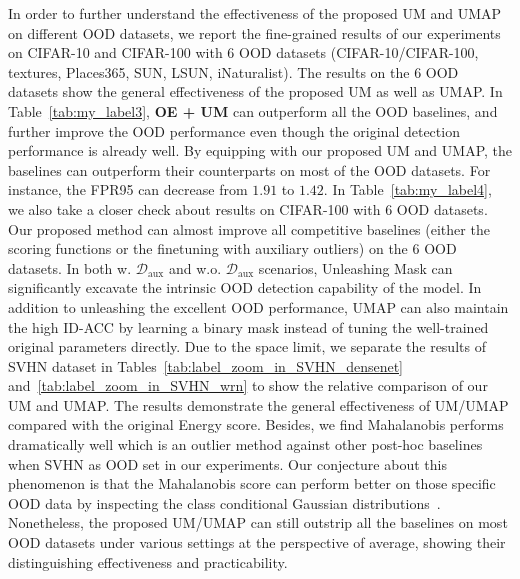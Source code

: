\documentclass{article}
\theoremstyle{plain}
\theoremstyle{definition}
\theoremstyle{remark}
\begin{document}
In order to further understand the effectiveness of the proposed UM and UMAP on different OOD datasets, we report the fine-grained results of our experiments on CIFAR-10 and CIFAR-100 with $6$ OOD datasets (CIFAR-10/CIFAR-100, textures, Places365, SUN, LSUN, iNaturalist). 
The results on the $6$ OOD datasets show the general effectiveness of the proposed UM as well as UMAP. 
In Table~\ref{tab:my_label3}, \textbf{OE + UM} can outperform all the OOD baselines, and further improve the OOD performance even though the original detection performance is already well. By equipping with our proposed UM and UMAP, the baselines can outperform their counterparts on most of the OOD datasets. For instance, the FPR95 can decrease from $1.91$ to $1.42$. In Table~\ref{tab:my_label4}, we also take a closer check about results on CIFAR-100 with $6$ OOD datasets. Our proposed method can almost improve all competitive baselines (either the scoring functions or the finetuning with auxiliary outliers) on the $6$ OOD datasets. In both w. $\mathcal{D}_\text{aux}$ and w.o. $\mathcal{D}_\text{aux}$ scenarios, Unleashing Mask can significantly excavate the intrinsic OOD detection capability of the model. In addition to unleashing the excellent OOD performance, UMAP can also maintain the high ID-ACC by learning a binary mask instead of tuning the well-trained original parameters directly. Due to the space limit, we separate the results of SVHN dataset in Tables~\ref{tab:label_zoom_in_SVHN_densenet} and~\ref{tab:label_zoom_in_SVHN_wrn} to show the relative comparison of our UM and UMAP. The results demonstrate the general effectiveness of UM/UMAP compared with the original Energy score. Besides, we find Mahalanobis performs dramatically well which is an outlier method against other post-hoc baselines when SVHN as OOD set in our experiments. Our conjecture about this phenomenon is that the Mahalanobis score can perform better on those specific OOD data by inspecting the class conditional Gaussian distributions~\citep{LeeLLS18}. Nonetheless, the proposed UM/UMAP can still outstrip all the baselines on most OOD datasets under various settings at the perspective of average, showing their distinguishing effectiveness and practicability.
\end{document}

